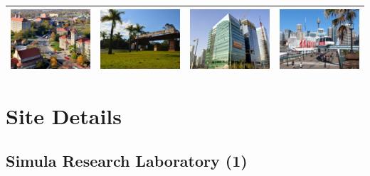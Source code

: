 \begin{small}
\begin{center}
\begin{longtable}{|c|c|c|c|}
 \hyperref[sec:KU]{\includegraphics[keepaspectratio,width=9em,height=6em]{NorNet-Configuration-Images/The_University_of_Kansas.jpeg}} & \hyperref[sec:UFSCAR]{\includegraphics[keepaspectratio,width=9em,height=6em]{NorNet-Configuration-Images/Universidade_Federal_de_Sao_Carlos.jpeg}} & \hyperref[sec:BLS]{\includegraphics[keepaspectratio,width=9em,height=6em]{NorNet-Configuration-Images/Bell_Labs_Seoul.jpeg}} & \hyperref[sec:NICTA]{\includegraphics[keepaspectratio,width=9em,height=6em]{NorNet-Configuration-Images/National_ICT_Australia.jpeg}} \\ \hline
\end{longtable}
\end{center}
\end{small}




\chapter{Site Details}
\label{cha:Site-Details}




\section{Simula Research Laboratory (1)}
\label{sec:SRL}

